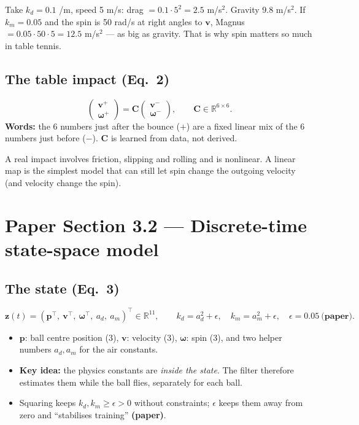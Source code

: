 \documentclass[11pt,a4paper]{article}
\newcommand{\vv}{\mathbf{v}}
\newcommand{\pp}{\mathbf{p}}
\newcommand{\zz}{\mathbf{z}}
\newcommand{\ww}{\boldsymbol{\omega}}
\begin{document}
\begin{toy}
Take $k_d=0.1$ /m, speed 5 m/s: drag $=0.1\cdot5^2=2.5$ m/s$^2$. Gravity 9.8 m/s$^2$. If $k_m=0.05$ and the spin is 50 rad/s at right angles to $\vv$, Magnus $=0.05\cdot50\cdot5=12.5$ m/s$^2$ --- as big as gravity.
That is why spin matters so much in table tennis.
\end{toy}

\subsection{The table impact (Eq.~2)}
\begin{eqbox}
\[
\begin{pmatrix}\vv^+\\ \ww^+\end{pmatrix}=\mathbf C\begin{pmatrix}\vv^-\\ \ww^-\end{pmatrix},\qquad\mathbf C\in\mathbb R^{6\times6}.
\]
\textbf{Words:} the 6 numbers just after the bounce ($+$) are a fixed linear mix of the 6 numbers just before ($-$). $\mathbf C$ is learned from data, not derived.
\end{eqbox}
A real impact involves friction, slipping and rolling and is nonlinear. A linear map is the simplest model that can still let spin change the outgoing velocity (and velocity change the spin).

\section{Paper Section 3.2 --- Discrete-time state-space model}
\subsection{The state (Eq.~3)}
\[
\zz(t)=(\pp^\top,\ \vv^\top,\ \ww^\top,\ a_d,\ a_m)^\top\in\mathbb R^{11},\qquad k_d=a_d^2+\epsilon,\quad k_m=a_m^2+\epsilon,\quad\epsilon=0.05\ \textbf{(paper)}.
\]
\begin{itemize}
\item $\pp$: ball centre position (3), $\vv$: velocity (3), $\ww$: spin (3), and two helper numbers $a_d,a_m$ for the air constants.
\item \textbf{Key idea:} the physics constants are \emph{inside the state}. The filter therefore estimates them while the ball flies, separately for each ball.
\item Squaring keeps $k_d,k_m\geq\epsilon>0$ without constraints; $\epsilon$ keeps them away from zero and ``stabilises training'' \textbf{(paper)}.
\end{itemize}
\end{document}
